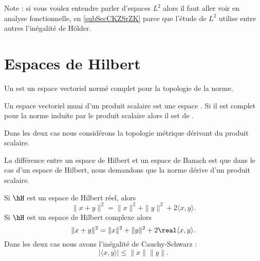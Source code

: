 
Note : si vous voulez entendre parler d'espaces \( L^2\) alors il faut aller voir en analyse fonctionnelle, en \ref{subSecCKZSrZK} parce que l'étude de \( L^2\) utilise entre autres l'inégalité de Hölder.

\section{Espaces de Hilbert}

\begin{definition}  \label{DefVKuyYpQ}
    Un  est un espace vectoriel normé complet pour la topologie de la norme. 
\end{definition}

\begin{definition}  \label{DefORuBdBN}
    Un espace vectoriel muni d'un produit scalaire est une espace . Si il est complet pour la norme induite par le produit scalaire alors il est de .

    Dans les deux cas nous considérons la topologie métrique dérivant du produit scalaire.
\end{definition}

La différence entre un espace de Hilbert et un espace de Banach est que dans le cas d'un espace de Hilbert, nous demandons que la norme dérive d'un produit scalaire.

\begin{proposition}     \label{PropTdupIG}
    Si \( \hH\) est un espace de Hilbert réel, alors
    \begin{equation}
        \| x+y \|^2=\| x \|^2+\| y \|^2+2\langle x, y\rangle .
    \end{equation}
    Si \( \hH\) est un espace de Hilbert complexe alors
    \begin{equation}        \label{EqrbBlkK}
        \| x+y \|^2=\| x \|^2+\| y \|^2+2\real\langle x, y\rangle .
    \end{equation}
    Dans les deux cas nous avons l'inégalité de Cauchy-Schwarz :
    \begin{equation}
        | \langle x, y\rangle  |\leq \| x \|\| y \|.
    \end{equation}
\end{proposition}

